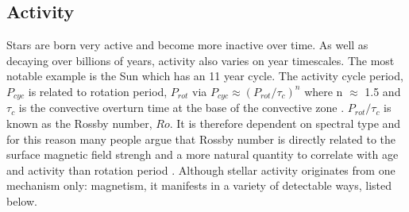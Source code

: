 \subsection{Activity}
Stars are born very active and become more inactive over time.
As well as decaying over billions of years, activity also varies on year
timescales.
The most notable example is the Sun which has an 11 year cycle.
The activity cycle period, $P_{cyc}$ is related to rotation period, $P_{rot}$
via $P_{cyc} \approx (P_{rot}/\tau_c)^n$ where n $\approx$ 1.5 and $\tau_c$ is
the convective overturn time at the base of the convective zone
\citep{Noyes1984}.
$P_{rot}/\tau_c$ is known as the Rossby number, $Ro$.
It is therefore dependent on spectral type and for this reason many people
argue that Rossby number is directly related to the surface magnetic field
strengh and a more natural quantity to correlate with age and activity than
rotation period \citep[\eg][]{Vansaders2015} \citep[although this view is not
universally held][]{Reiners2014}.
Although stellar activity originates from one mechanism only: magnetism,
it manifests in a variety of detectable ways, listed below.

